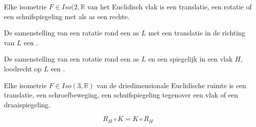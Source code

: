 \documentclass[main.tex]{subfiles}
\begin{document}
\begin{st}
  Elke isometrie $F\in Iso(2,\mathbb{R}$ van het Euclidisch vlak is een translatie, een rotatie of een schuifspiegeling met als as een rechte.
\end{st}

\begin{de}
  De samenstelling van een ratatie rond een as $L$ met een translatie in de richting van $L$ een .
\end{de}

\begin{de}
  De samenstelling van een rotatie rond een as $L$ en een spiegelijk in een vlak $H$, loodrecht op $L$ een .
\end{de}

\begin{st}
  Elke isometrie $F\in Iso(3,\mathbb{R})$ van de driedimensionale Euclidische ruimte is een translatie, een schroefbeweging, een schuifspiegeling tegenover een vlak of een draaispiegeling.
\end{st}

\begin{st}
  \[ R_{H} \circ K = K \circ R_{H} \]
\end{st}
\end{document}
